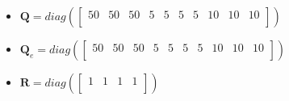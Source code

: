\documentclass{thesisreport}
\begin{document}
\begin{itemize}
	\item $\bm{Q} = diag(
	\begin{bmatrix}
			50 & 50 & 50 & 5 & 5 & 5 & 5 & 10 & 10 & 10\\
	\end{bmatrix})$
	
	\item $\bm{Q}_e = diag(
	\begin{bmatrix}
			50 & 50 & 50 & 5 & 5 & 5 & 5 & 10 & 10 & 10\\
	\end{bmatrix})$
	
	\item $\bm{R} =diag(
	\begin{bmatrix}
			1 & 1 & 1 & 1\\
	\end{bmatrix})$
\end{itemize}
	
\end{document}
